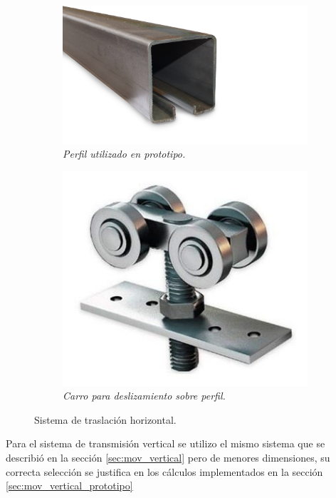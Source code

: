\begin{figure}[H]
    \centering
    \begin{subfigure}{0.35\textwidth}
        \centering
        \includegraphics[width=\textwidth]{img/perfil_porton.png}
        \caption{\textit{Perfil utilizado en prototipo.}}
        \label{fig:perfil_porton}
    \end{subfigure}
    \hfill
    \begin{subfigure}{0.35\textwidth}
        \centering
        \includegraphics[width=\textwidth]{img/carro_porton.png}
        \caption{\textit{Carro para deslizamiento sobre perfil.}}
        \label{fig:carro_porton}
    \end{subfigure}
    \caption{Sistema de traslación horizontal.}
\end{figure}
Para el sistema de transmisión vertical se utilizo el mismo sistema que se describió en la sección \ref{sec:mov_vertical} pero de menores dimensiones, su correcta selección se justifica en los cálculos implementados en la sección \ref{sec:mov_vertical_prototipo}